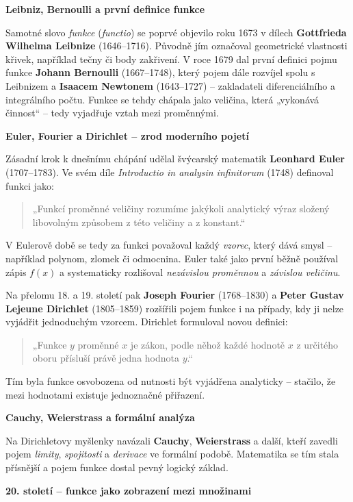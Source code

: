 \documentclass[12pt,a4paper]{article}
\begin{document}
\begin{historicalbox}
\newpage
\textbf{Leibniz, Bernoulli a první definice funkce}

Samotné slovo \emph{funkce} (\textit{functio}) se poprvé objevilo roku 1673 v dílech \textbf{Gottfrieda Wilhelma Leibnize} (1646–1716).  
Původně jím označoval geometrické vlastnosti křivek, například tečny či body zakřivení.  
V roce 1679 dal první definici pojmu funkce \textbf{Johann Bernoulli} (1667–1748), který pojem dále rozvíjel spolu s Leibnizem a \textbf{Isaacem Newtonem} (1643–1727) – zakladateli diferenciálního a integrálního počtu.  
Funkce se tehdy chápala jako veličina, která „vykonává činnost“ – tedy vyjadřuje vztah mezi proměnnými.

\medskip
\textbf{Euler, Fourier a Dirichlet – zrod moderního pojetí}

Zásadní krok k dnešnímu chápání udělal švýcarský matematik \textbf{Leonhard Euler} (1707–1783).  
Ve svém díle \textit{Introductio in analysin infinitorum} (1748) definoval funkci jako:
\begin{quote}
„Funkcí proměnné veličiny rozumíme jakýkoli analytický výraz složený libovolným způsobem z této veličiny a z konstant.“
\end{quote}
V Eulerově době se tedy za funkci považoval každý \emph{vzorec}, který dává smysl – například polynom, zlomek či odmocnina.  
Euler také jako první běžně používal zápis \(f(x)\) a systematicky rozlišoval \textit{nezávislou proměnnou} a \textit{závislou veličinu}.  

Na přelomu 18. a 19. století pak \textbf{Joseph Fourier} (1768–1830) a \textbf{Peter Gustav Lejeune Dirichlet} (1805–1859) rozšířili pojem funkce i na případy, kdy ji nelze vyjádřit jednoduchým vzorcem.  
Dirichlet formuloval novou definici:
\begin{quote}
„Funkce \(y\) proměnné \(x\) je zákon, podle něhož každé hodnotě \(x\) z určitého oboru přísluší právě jedna hodnota \(y\).“
\end{quote}
Tím byla funkce osvobozena od nutnosti být vyjádřena analyticky – stačilo, že mezi hodnotami existuje jednoznačné přiřazení.  

\medskip
\textbf{Cauchy, Weierstrass a formální analýza}

Na Dirichletovy myšlenky navázali \textbf{Cauchy}, \textbf{Weierstrass} a další, kteří zavedli pojem \emph{limity}, \emph{spojitosti} a \emph{derivace} ve formální podobě.  
Matematika se tím stala přísnější a pojem funkce dostal pevný logický základ.

\medskip
\textbf{20. století – funkce jako zobrazení mezi množinami}


\end{historicalbox}
\end{document}

